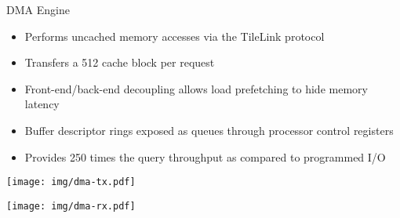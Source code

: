 \begin{block}{DMA Engine}
\begin{itemize}
\footnotesize
\item Performs uncached memory accesses via the TileLink protocol
\item Transfers a \SI{512}{\bit} cache block per request
\item Front-end/back-end decoupling allows load prefetching to hide
	memory latency
\item Buffer descriptor rings exposed as queues through processor
	control registers
\item Provides 250 times the query throughput as compared to programmed I/O
\end{itemize}

\begin{multicols}{2}
\centering
\texttt{[image: img/dma-tx.pdf]}

\columnbreak

\centering
\texttt{[image: img/dma-rx.pdf]}
\end{multicols}
\end{block}

